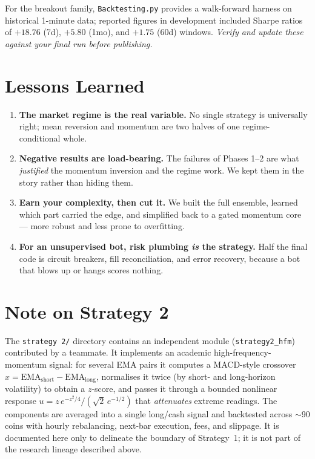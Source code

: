 \documentclass[11pt,a4paper]{article}
\newcommand{\code}[1]{\texttt{#1}}
\begin{document}
\noindent
For the breakout family, \code{Backtesting.py} provides a walk-forward harness on
historical 1-minute data; reported figures in development included Sharpe ratios of
$+18.76$ (7d), $+5.80$ (1mo), and $+1.75$ (60d) windows. \emph{Verify and update
these against your final run before publishing.}

\section{Lessons Learned}
\begin{enumerate}[noitemsep]
  \item \textbf{The market regime is the real variable.} No single strategy is
        universally right; mean reversion and momentum are two halves of one
        regime-conditional whole.
  \item \textbf{Negative results are load-bearing.} The failures of Phases 1--2
        are what \emph{justified} the momentum inversion and the regime work. We
        kept them in the story rather than hiding them.
  \item \textbf{Earn your complexity, then cut it.} We built the full ensemble,
        learned which part carried the edge, and simplified back to a gated
        momentum core --- more robust and less prone to overfitting.
  \item \textbf{For an unsupervised bot, risk plumbing \emph{is} the strategy.}
        Half the final code is circuit breakers, fill reconciliation, and error
        recovery, because a bot that blows up or hangs scores nothing.
\end{enumerate}

\appendix
\section{Note on Strategy 2}
\label{app:strat2}
The \code{strategy 2/} directory contains an independent module
(\code{strategy2\_hfm}) contributed by a teammate. It implements an academic
high-frequency-momentum signal: for several EMA pairs it computes a MACD-style
crossover $x=\mathrm{EMA}_{\text{short}}-\mathrm{EMA}_{\text{long}}$, normalises it
twice (by short- and long-horizon volatility) to obtain a $z$-score, and passes it
through a bounded nonlinear response $u = z\,e^{-z^2/4}/(\sqrt{2}\,e^{-1/2})$ that
\emph{attenuates} extreme readings. The components are averaged into a single
long/cash signal and backtested across $\sim$90 coins with hourly rebalancing,
next-bar execution, fees, and slippage. It is documented here only to delineate the
boundary of Strategy~1; it is not part of the research lineage described above.
\end{document}
